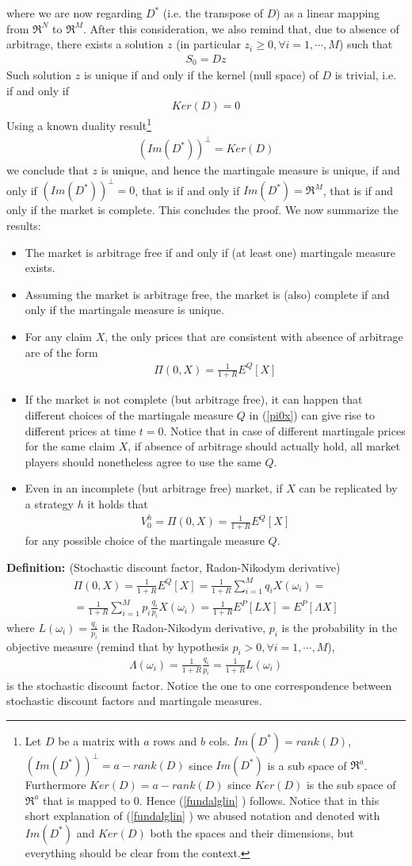 \documentclass[a4paper,10pt]{report}
\theoremstyle{plain}
\theoremstyle{definition}
\newcommand\be{\begin{eqnarray}}    %
\newcommand\ee{\end{eqnarray}}
\newcommand{\DEF} {{\bf{Definition: }}}
\begin{document}
where we are now regarding $D^*$ (i.e. the transpose of $D$) as a linear mapping from $\Re^N$ to $\Re^M$. After this consideration, we also remind that, due to absence of arbitrage, there exists a solution $z$ (in particular $z_i\ge 0, \forall i=1,\cdots,M$) such that
\be 
S_0=D z
\ee
Such solution $z$ is unique if and only if the kernel (null space) of $D$ is trivial, i.e. if and only if 
\be 
Ker\left( D\right) =0
\ee
Using a known duality result\footnote{Let $D$ be a matrix with $a$ rows and $b$ cols. $Im(D^*)=rank(D)$, $(Im(D^*))^\perp=a-rank(D)$ since $Im(D^*)$ is a sub space of $\Re^a$. Furthermore $Ker(D)=a-rank(D)$ since $Ker(D)$ is the sub space of $\Re^a$ that is mapped to $0$. Hence (\ref{fundalglin} ) follows. Notice that in this short explanation of (\ref{fundalglin} ) we abused notation and denoted with  $Im(D^*)$ and $Ker(D)$ both the spaces and their dimensions, but everything should be clear from the context.}
\be
\label{fundalglin} 
\left(Im\left( D^*\right)\right)^\perp =Ker\left( D\right)
\ee
we conclude that $z$ is unique, and hence the martingale measure is unique, if and only if $\left(Im\left( D^*\right)\right)^\perp=0$, that is if and only if $Im\left( D^*\right) = \Re^M$,  that is if and only if the market is complete.
This concludes the proof.
We now summarize the results:
\begin{itemize}
\item The market is arbitrage free if and only if (at least one) martingale measure exists.
\item Assuming the market is arbitrage free, the market is (also) complete if and only if the martingale measure is unique.
\item For any claim $X$, the only prices that are consistent with absence of arbitrage are of the form 
\be 
\label{pi0x}
\Pi(0,X)=\frac{1}{1+R}E^Q[X]
\ee
\item If the market is not complete (but arbitrage free), it can happen that different choices of the martingale measure $Q$ in (\ref{pi0x}) can give rise to different prices at time $t=0$. Notice that in case of different martingale prices for the same claim $X$, if absence of arbitrage should actually hold, all market players should nonetheless agree to use the same $Q$.
\item Even in an incomplete (but arbitrage free) market, if $X$ can be replicated by a strategy $h$ it holds that 
\be 
V^h_0=\Pi(0,X)=\frac{1}{1+R}E^Q[X]
\ee
for any possible choice of the martingale measure $Q$.
\end{itemize}
\DEF (Stochastic discount factor, Radon-Nikodym derivative)
\be 
\Pi(0,X)=\frac{1}{1+R}E^Q[X] = \frac{1}{1+R}\sum_{i=1}^M q_i X(\omega_i)= \\ 
=\frac{1}{1+R}\sum_{i=1}^M p_i \frac{q_i}{p_i} X(\omega_i)=\frac{1}{1+R}E^P[L X]=E^P[\Lambda X]
\ee
where $L(\omega_i) = \frac{q_i}{p_i}$ is the Radon-Nikodym derivative, $p_i$ is the probability in the objective measure (remind that by hypothesis $p_i>0, \forall i=1,\cdots, M$), 
\be 
\Lambda(\omega_i) = \frac{1}{1+R} \frac{q_i}{p_i}  = \frac{1}{1+R} L(\omega_i)
\ee
is the stochastic discount factor. Notice the one to one correspondence between stochastic discount factors and martingale measures.
\end{document}
